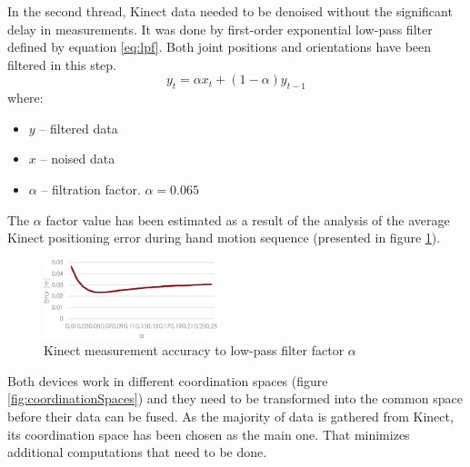 \documentclass[9pt]{llncs}
\begin{document}
In the second thread, Kinect data needed to be denoised without the significant delay in measurements. It was done by first-order exponential low-pass filter defined by equation \ref{eq:lpf}. Both joint positions and orientations have been filtered in this step.
\begin{equation}
	\label{eq:lpf}
	y_t = \alpha x_t + (1-\alpha)y_{t-1}
\end{equation}
where:
\begin{itemize}
	\item $y$ -- filtered data
	\item $x$ -- noised data
	\item $\alpha$ -- filtration factor. $\alpha = 0.065$
\end{itemize}

The $\alpha$ factor value has been estimated as a result of the analysis of the average Kinect positioning error during hand motion sequence (presented in figure \ref{fig:lowPass}).

\begin{figure}[!htb]
	\centering 
	\includegraphics[width=0.45\textwidth]{Fig05.eps}
	\caption{Kinect measurement accuracy to low-pass filter factor $\alpha$}
	\label{fig:lowPass}
\end{figure}

Both devices work in different coordination spaces (figure \ref{fig:coordinationSpaces}) and they need to be transformed into the common space before their data can be fused. As the majority of data is gathered from Kinect, its coordination space has been chosen as the main one. That minimizes additional computations that need to be done.
\end{document}
